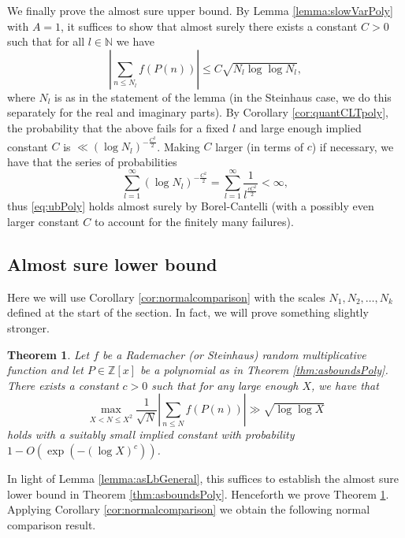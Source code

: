 \documentclass[11pt]{tran-l}
\newtheorem{theorem}{Theorem}[section]
\theoremstyle{definition}
\theoremstyle{remark}
\numberwithin{equation}{section}
\begin{document}
We finally prove the almost sure upper bound. By Lemma \ref{lemma:slowVarPoly} with $A=1$, it suffices to show that almost surely there exists a constant $C>0$ such that for all $l\in\mathbb N$ we have
    \begin{equation}\label{eq:ubPoly}
        \left\lvert\sum_{n\leq N_l} f(P(n))\right\rvert\leq C \sqrt{N_l\log\log N_l},
    \end{equation}
    where $N_l$ is as in the statement of the lemma (in the Steinhaus case, we do this separately for the real and imaginary parts). By Corollary \ref{cor:quantCLTpoly}, the probability that the above fails for a fixed $l$ and large enough implied constant $C$ is $\ll (\log N_l)^{-\frac{C^2}{2}}$. Making $C$ larger (in terms of $c$) if necessary, we have that the series of probabilities $$\sum_{l=1}^\infty (\log N_l)^{-\frac{C^2}{2}} = \sum_{l=1}^\infty \frac{1}{l^{\frac{cC^2}{2}}}<\infty,$$ thus \eqref{eq:ubPoly} holds almost surely by Borel-Cantelli (with a possibly even larger constant $C$ to account for the finitely many failures). 



    

\subsection{Almost sure lower bound} Here we will use Corollary \ref{cor:normalcomparison} with the scales $N_1, N_2, \ldots, N_k$ defined at the start of the section. In fact, we will prove something slightly stronger.

\begin{theorem}\label{thm:localizedBoundPoly}
    Let $f$ be a Rademacher (or Steinhaus) random multiplicative function and let $P\in\mathbb Z[x]$  be a polynomial as in Theorem \ref{thm:asboundsPoly}. There exists a constant $c>0$ such that for any large enough $X$, we have that 
    \begin{equation*}
        \max_{X<N\leq X^2} \frac{1}{\sqrt N} \left\lvert\sum_{n\leq N}f(P(n)) \right\rvert \gg \sqrt{\log\log X}
    \end{equation*} holds with a suitably small implied constant with probability $1-O(\exp(-(\log X)^{c}))$. 
\end{theorem}

In light of Lemma \ref{lemma:asLbGeneral}, this suffices to establish the almost sure lower bound in Theorem \ref{thm:asboundsPoly}. Henceforth we prove Theorem \ref{thm:localizedBoundPoly}. Applying Corollary \ref{cor:normalcomparison} we obtain the following normal comparison result.
\end{document}
